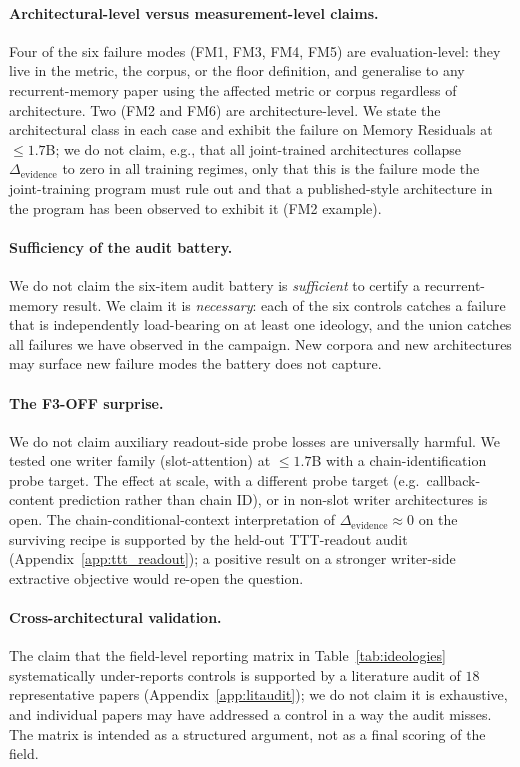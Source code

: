 \documentclass{article}
\newcommand{\elift}{\Delta_{\mathrm{evidence}}}
\begin{document}
\paragraph{Architectural-level versus measurement-level claims.}
Four of the six failure modes (FM1, FM3, FM4, FM5) are
evaluation-level: they live in the metric, the corpus, or the floor
definition, and generalise to any recurrent-memory paper using the
affected metric or corpus regardless of architecture.  Two (FM2 and
FM6) are architecture-level.  We state the architectural class in
each case and exhibit the failure on Memory Residuals at
$\le 1.7$B; we do not claim, e.g., that all joint-trained
architectures collapse $\elift$ to zero in all training regimes,
only that this is the failure mode the joint-training program must
rule out and that a published-style architecture in the program has
been observed to exhibit it (FM2 example).

\paragraph{Sufficiency of the audit battery.}  We do not claim the
six-item audit battery is \emph{sufficient} to certify a
recurrent-memory result.  We claim it is \emph{necessary}: each of
the six controls catches a failure that is independently load-bearing
on at least one ideology, and the union catches all failures we have
observed in the campaign.  New corpora and new architectures may
surface new failure modes the battery does not capture.

\paragraph{The F3-OFF surprise.}  We do not claim auxiliary
readout-side probe losses are universally harmful.  We tested one
writer family (slot-attention) at $\le 1.7$B with a chain-identification
probe target.  The effect at scale, with a different probe target
(e.g.\ callback-content prediction rather than chain ID), or in
non-slot writer architectures is open.  The
chain-conditional-context interpretation of $\elift \approx 0$ on
the surviving recipe is supported by the held-out TTT-readout audit
(Appendix~\ref{app:ttt_readout}); a positive result on a stronger
writer-side extractive objective would re-open the question.

\paragraph{Cross-architectural validation.}  The claim that the
field-level reporting matrix in Table~\ref{tab:ideologies}
systematically under-reports controls is supported by a literature
audit of $18$ representative papers
(Appendix~\ref{app:litaudit}); we do not claim it is exhaustive,
and individual papers may have addressed a control in a way the
audit misses.  The matrix is intended as a structured argument, not
as a final scoring of the field.
\end{document}
